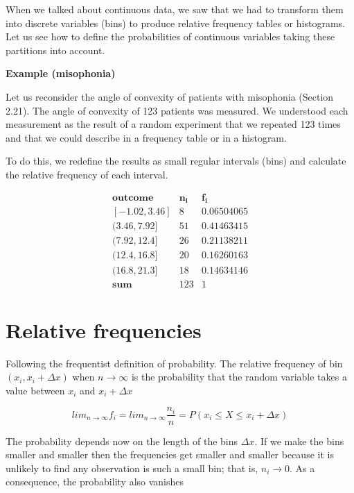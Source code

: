 \documentclass[
]{book}
\begin{document}
When we talked about continuous data, we saw that we had to transform them into discrete variables (bins) to produce relative frequency tables or histograms. Let us see how to define the probabilities of continuous variables taking these partitions into account.

\textbf{Example (misophonia)}

Let us reconsider the angle of convexity of patients with misophonia (Section 2.21). The angle of convexity of 123 patients was measured. We understood each measurement as the result of a random experiment that we repeated 123 times and that we could describe in a frequency table or in a histogram.

To do this, we redefine the results as small regular intervals (bins) and calculate the relative frequency of each interval.

\[
\begin{array}{ccc}
\mathbf{outcome} & \mathbf{n_i} & \mathbf{f_i} \\
\mathrm{[-1.02,3.46]}   &  8  & 0.06504065 \\
\mathrm{(3.46,7.92]}    & 51  & 0.41463415 \\
\mathrm{(7.92,12.4]}    & 26  & 0.21138211 \\
\mathrm{(12.4,16.8]}    & 20  & 0.16260163 \\
\mathrm{(16.8,21.3]}    & 18  & 0.14634146 \\ \hline
\mathbf{sum}   & 123 & 1
\end{array}
\]

\hypertarget{relative-frequencies-2}{%
\section{Relative frequencies}\label{relative-frequencies-2}}

Following the frequentist definition of probability. The relative frequency of bin \((x_i, x_i + \Delta x)\) when \(n \rightarrow \infty\) is the probability that the random variable takes a value between \(x_i\) and \(x_i + \Delta x\)

\[lim_{n\rightarrow\infty}f_i=lim_{n\rightarrow\infty}\frac{n_i}{n} = P(x_i \leq X  \leq x_i + \Delta x)\]

The probability depends now on the length of the bins \(\Delta x\). If we make the bins smaller and smaller then the frequencies get smaller and smaller because it is unlikely to find any observation is such a small bin; that is, \(n_i \rightarrow 0\). As a consequence, the probability also vanishes
\end{document}
